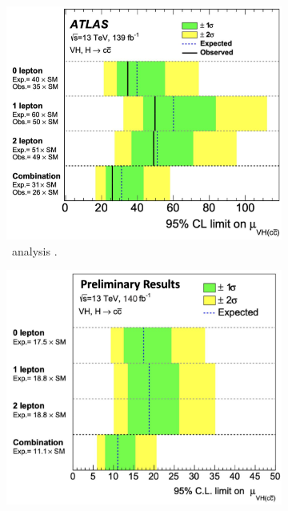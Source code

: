 \begin{figure}[h!]
    \centering
    \begin{subfigure}[b]{0.32\textwidth}
        \centering
        \includegraphics[width=\textwidth]{Images/VH/Fit/fromSlides/oldVHcc.png}
        \caption{\vhc\ analysis \cite{Collaboration:2721696}.}
        \label{fig:fit_old_vhcclimit}
    \end{subfigure}
    \begin{subfigure}[b]{0.32\textwidth}
        \centering
        \includegraphics[width=\textwidth]{Images/VH/Fit/fromSlides/postfitVHcc.png}

\end{subfigure}
\end{figure}
